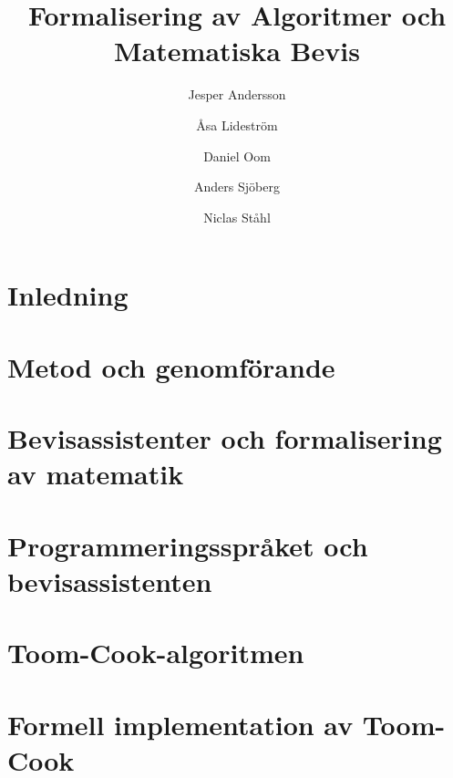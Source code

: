 \documentclass[a4paper]{report}
\title{Formalisering av Algoritmer och Matematiska Bevis}
\author{Jesper Andersson\and Åsa Lideström\and Daniel Oom\and Anders Sjöberg\and Niclas Ståhl}
\begin{document}
\maketitle

\begin{abstract}

\end{abstract}
\begin{abstract}

\end{abstract}
\renewcommand{\abstractname}{Tacksägelser}
\begin{abstract}

\end{abstract}

\tableofcontents

\chapter{Inledning}
\label{sec:inledning}


\newpage
\chapter{Metod och genomförande}
\label{sec:metod}


\newpage
\chapter{Bevisassistenter och formalisering av matematik}
\label{sec:formalisering}


\newpage
\chapter{Programmeringsspråket och bevisassistenten \coq}
\label{sec:coq}







\newpage
\chapter{Toom-Cook-algoritmen}
\label{sec:toomcook}






\newpage
\chapter{Formell implementation av Toom-Cook}
\label{sec:formell}


\end{document}
